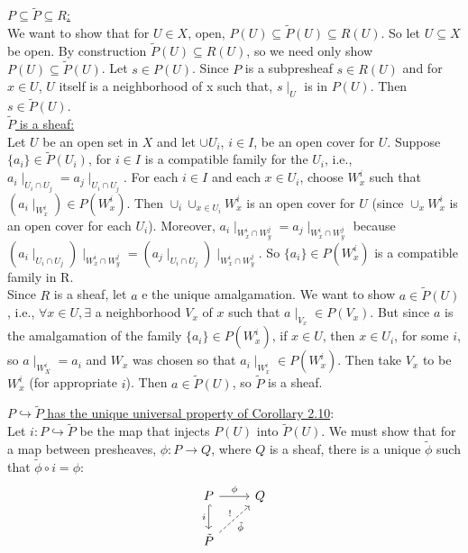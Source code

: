 \underline{$P \subseteq \tilde{P} \subseteq R$:}\\
We want to show that for $U \in X$, open, $P(U) \subseteq \tilde{P}(U) \subseteq R(U)$. So let $U \subseteq X$ be open. By construction $\tilde{P}(U) \subseteq R(U)$, so we need only show $P(U) \subseteq \tilde {P}(U)$. Let $s \in P(U)$. Since $P$ is a subpresheaf $s \in R(U)$ and for $x \in U$, $U$ itself is a neighborhood of x such that, $s \mid_U$ is in $P(U)$. Then $s \in \tilde{P}(U)$. \\

\underline{$\tilde{P}$ is a sheaf:}\\
Let $U$ be an open set in $X$ and let $\cup U_i$, $i \in I$, be an open cover for $U$. Suppose $\{a_i\} \in \tilde{P}(U_i)$, for $i \in I$ is a compatible family for the $U_i$, i.e., $a_i \mid_{U_i \cap U_j} =a_j \mid_{U_i \cap U_j}$.
For each $i \in I$ and each $x \in U_i$, choose $W_x^i$ such that $(a_i \mid_{W_x^i}) \in P(W_x^i)$. Then $\cup_i \cup_{x \in U_i} W_x^i$ is an open cover for $U$ (since $\cup_x W_x^i$ is an open cover for each $U_i$). Moreover, $a_i \mid_{W_x^i \cap W_y^j}=a_j \mid_{W_x^i \cap W_y^j}$ because $(a_i \mid_{U_i \cap U_j}) \mid_{W_x^i \cap W_y^j}=(a_j\mid_{U_i \cap U_j}) \mid_{W_x^i \cap W_y^j}$. So $\{a_i\} \in P(W_x^i)$ is a compatible family in R.\\

Since $R$ is a sheaf, let $a$ e the unique amalgamation. We want to show $a \in \tilde{P}(U)$, i.e., $\forall x \in U, \exists$ a neighborhood $V_x$ of $x$ such that $a \mid_{V_x} \in P(V_x)$. But since $a$ is the amalgamation of the family $\{a_i\} \in P(W_x^i)$, if $x \in U$, then $x \in U_i$, for some $i$, so $a \mid_{W_X^i} = a_i$ and $W_x$ was chosen so that $a_i \mid_{W_x^i} \in P(W_x^i)$. Then take $V_x$ to be $W_x^i$ (for appropriate $i$). Then $a \in \tilde{P}(U)$, so $\tilde{P}$ is a sheaf. \newpage

\underline{$P \hookrightarrow \tilde{P}$ has the unique universal property of Corollary 2.10}:\\

Let $i: P \hookrightarrow \tilde{P}$ be the map that injects $P(U)$ into $\tilde{P}(U)$. We must show that for a map between presheaves, $\phi: P \rightarrow Q$, where $Q$ is a sheaf, there is a unique $\tilde{\phi}$ such that $\tilde{\phi} \circ i = \phi$: \\


\[
\begin{tikzcd}
P \arrow[r,"\phi"] \arrow[d, hook, "i"']
& Q \\
\tilde{P} \arrow[ru, "!", "\tilde{\phi}"', dashed]
\end{tikzcd}
\]

